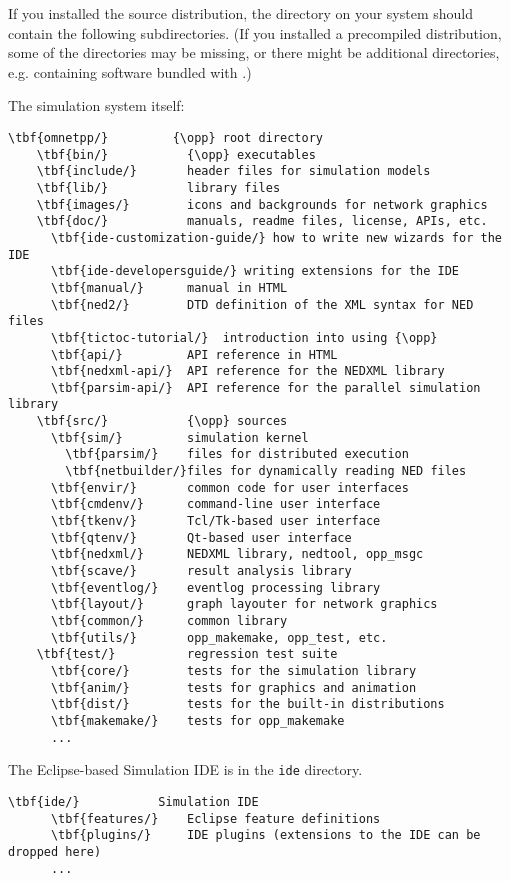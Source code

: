 If you installed the source distribution, the {\opp} directory on your system
should contain the following subdirectories. (If you installed a precompiled
distribution, some of the directories may be missing, or there might be
additional directories, e.g. containing software bundled with {\opp}.)

The simulation system itself:

\begin{Verbatim}[commandchars=\\\{\}]
  \tbf{omnetpp/}         {\opp} root directory
    \tbf{bin/}           {\opp} executables
    \tbf{include/}       header files for simulation models
    \tbf{lib/}           library files
    \tbf{images/}        icons and backgrounds for network graphics
    \tbf{doc/}           manuals, readme files, license, APIs, etc.
      \tbf{ide-customization-guide/} how to write new wizards for the IDE
      \tbf{ide-developersguide/} writing extensions for the IDE
      \tbf{manual/}      manual in HTML
      \tbf{ned2/}        DTD definition of the XML syntax for NED files
      \tbf{tictoc-tutorial/}  introduction into using {\opp}
      \tbf{api/}         API reference in HTML
      \tbf{nedxml-api/}  API reference for the NEDXML library
      \tbf{parsim-api/}  API reference for the parallel simulation library
    \tbf{src/}           {\opp} sources
      \tbf{sim/}         simulation kernel
        \tbf{parsim/}    files for distributed execution
        \tbf{netbuilder/}files for dynamically reading NED files
      \tbf{envir/}       common code for user interfaces
      \tbf{cmdenv/}      command-line user interface
      \tbf{tkenv/}       Tcl/Tk-based user interface
      \tbf{qtenv/}       Qt-based user interface
      \tbf{nedxml/}      NEDXML library, nedtool, opp_msgc
      \tbf{scave/}       result analysis library
      \tbf{eventlog/}    eventlog processing library
      \tbf{layout/}      graph layouter for network graphics
      \tbf{common/}      common library
      \tbf{utils/}       opp_makemake, opp_test, etc.
    \tbf{test/}          regression test suite
      \tbf{core/}        tests for the simulation library
      \tbf{anim/}        tests for graphics and animation
      \tbf{dist/}        tests for the built-in distributions
      \tbf{makemake/}    tests for opp_makemake
      ...
\end{Verbatim}

The Eclipse-based Simulation IDE is in the \texttt{ide} directory.

\begin{Verbatim}[commandchars=\\\{\}]
    \tbf{ide/}           Simulation IDE
      \tbf{features/}    Eclipse feature definitions
      \tbf{plugins/}     IDE plugins (extensions to the IDE can be dropped here)
      ...
\end{Verbatim}

